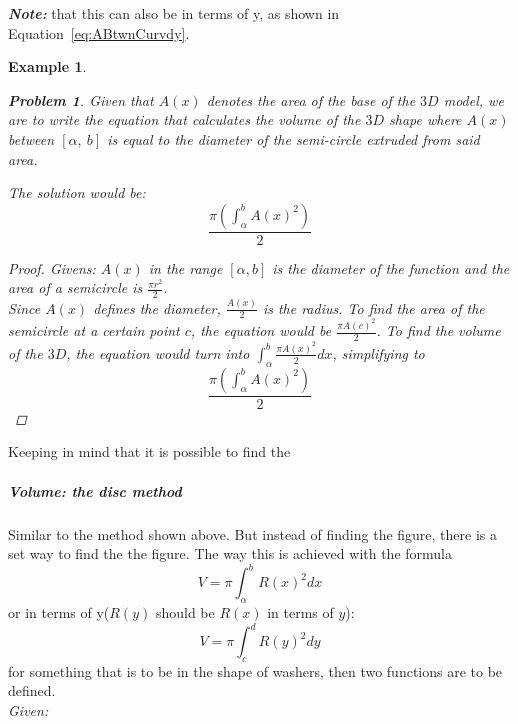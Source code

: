 \documentclass{article} %
\newtheorem{exmp}{Example}[paragraph]
\newtheorem{problem}{Problem}
\theoremstyle{theorem}
\theoremstyle{definition}
\begin{document}
                    \textbf{\textit{Note:}} that this can also be in terms of y, as shown in Equation~\ref{eq:ABtwnCurvdy}.
                    \begin{exmp}
                        \begin{problem}
                            Given that $A(x)$ denotes the area of the base of the $3D$ model, we are to write the equation that calculates the volume of the $3D$ shape where $A(x)$ between $[\alpha,\ b]$ is equal to the diameter of the semi-circle extruded from said area.
                        \end{problem}
                        The solution would be: \[
                            \dfrac{\pi(\int_\alpha^bA(x)^2)}{2}
                        \]
                        \begin{proof}
                            \textit{Givens}: $A(x)$ in the range $[\alpha, b]$ is the diameter of the function and the area of a semicircle is $\frac{\pi r^2}{2}$.
                            \\Since $A(x)$ defines the diameter, $\frac{A(x)}{2}$ is the radius. To find the area of the semicircle at a certain point $c$, the equation would be $\frac{\pi A(c)^2}{2}$. To find the volume of the $3D$, the equation would turn into $\int^b_\alpha \frac{\pi A(x)^2}{2}dx$, simplifying to 
                            $$\dfrac{\pi(\int_\alpha^bA(x)^2)}{2}$$
                        \end{proof}
                    \end{exmp}
                    Keeping in mind that it is possible to find the  
                \subparagraph{Volume: the disc method}
                    Similar to the method shown above. But instead of finding the figure, there is a set way to find the the figure.
                    The way this is achieved with the formula 
                    \begin{equation}
                        V=\pi \int_{\alpha}^{b}R(x)^2dx
                        \label{eq:volDiscDx}
                    \end{equation}
                    or in terms of y($R(y)$ should be $R(x)$ in terms of $y$):
                    \begin{equation}
                        V=\pi \int_{c}^{d}R(y)^2dy
                        \label{eq:volDiscDx}
                    \end{equation}
                    for something that is to be in the shape of washers, then two functions are to be defined.
                  \\\textit{Given:}
\end{document}
